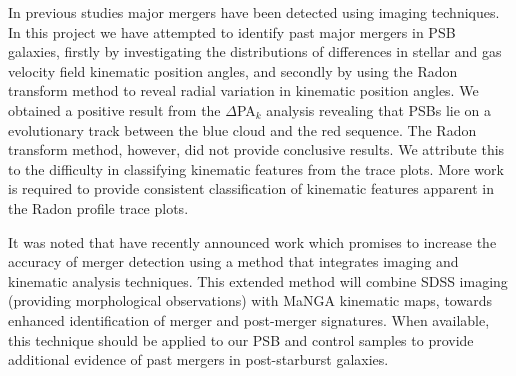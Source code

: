 In previous studies major mergers have been detected using imaging techniques. In this project we have attempted to identify past major mergers in PSB galaxies, firstly by investigating the distributions of differences in stellar and gas velocity field kinematic position angles, and secondly by using the Radon transform method to reveal radial variation in kinematic position angles. 
We obtained a positive result from the $\Delta$PA$_{k}$ analysis revealing that PSBs lie on a evolutionary track between the blue cloud and the red sequence. The Radon transform method, however, did not provide conclusive results. We attribute this to the difficulty in classifying kinematic features from the trace plots. More work is required to provide consistent classification of kinematic features apparent in the Radon profile trace plots. 

It was noted that \cite{2019DDA....5020304N} have recently announced work which promises to increase the accuracy of merger detection using a method that integrates imaging and kinematic analysis techniques. This extended method will combine SDSS imaging (providing morphological observations) with MaNGA  kinematic maps, towards enhanced identification of merger and post-merger signatures. When available, this technique should be applied to our PSB and control samples to provide additional evidence of past mergers in post-starburst galaxies.
